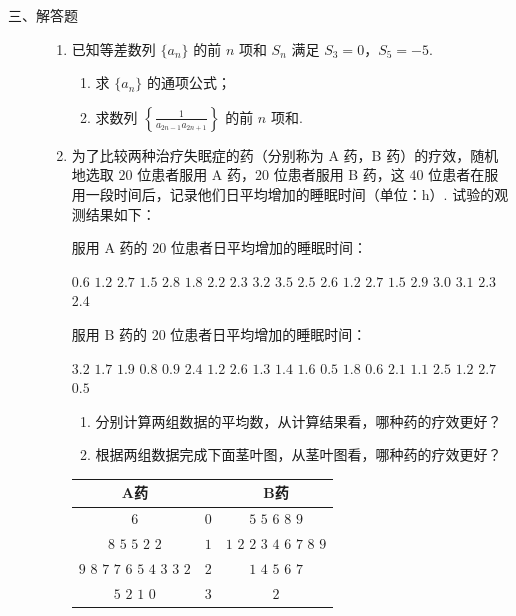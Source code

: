 \begin{description}

    \item[三、解答题]

    \begin{enumerate}[leftmargin=5pt]

      \addtocounter{enumi}{+16}

        \item 已知等差数列 \(\{a_{n}\}\) 的前 \(n\) 项和 \(S_{n}\) 满足 \(S_{3} = 0\)，\(S_{5} = -5\).
\begin{enumerate}
\item 求 \( \{a_{n}\} \) 的通项公式；
\item 求数列 \(\left\{\frac{1}{a_{2n-1}a_{2n+1}}\right\}\) 的前 \(n\) 项和.
\end{enumerate}

        \item 为了比较两种治疗失眠症的药（分别称为 A 药，B 药）的疗效，随机地选取 \(20\) 位患者服用 A 药，\(20\) 位患者服用 B 药，这 \(40\) 位患者在服用一段时间后，记录他们日平均增加的睡眠时间（单位：\(\mathrm{h}\)）. 试验的观测结果如下：

服用 A 药的 \(20\) 位患者日平均增加的睡眠时间：

\(0.6\) \(1.2\) \(2.7\) \(1.5\) \(2.8\) \(1.8\) \(2.2\) \(2.3\) \(3.2\) \(3.5\)
\(2.5\) \(2.6\) \(1.2\) \(2.7\) \(1.5\) \(2.9\) \(3.0\) \(3.1\) \(2.3\) \(2.4\)

服用 B 药的 \(20\) 位患者日平均增加的睡眠时间：

\(3.2\) \(1.7\) \(1.9\) \(0.8\) \(0.9\) \(2.4\) \(1.2\) \(2.6\) \(1.3\) \(1.4\)
\(1.6\) \(0.5\) \(1.8\) \(0.6\) \(2.1\) \(1.1\) \(2.5\) \(1.2\) \(2.7\) \(0.5\)

\begin{enumerate}
\item 分别计算两组数据的平均数，从计算结果看，哪种药的疗效更好？
\item 根据两组数据完成下面茎叶图，从茎叶图看，哪种药的疗效更好？
\end{enumerate}

\begin{center}
\begin{tabular}{c|c|c}
A药 &  & B药 \\
\hline
\(6\) & \(0\) & \(5\) \(5\) \(6\) \(8\) \(9\) \\
\(8\) \(5\) \(5\) \(2\) \(2\) & \(1\) & \(1\) \(2\) \(2\) \(3\) \(4\) \(6\) \(7\) \(8\) \(9\) \\
\(9\) \(8\) \(7\) \(7\) \(6\) \(5\) \(4\) \(3\) \(3\) \(2\) & \(2\) & \(1\) \(4\) \(5\) \(6\) \(7\) \\
\(5\) \(2\) \(1\) \(0\) & \(3\) & \(2\)
\end{tabular}
\end{center}


\end{enumerate}
\end{description}
